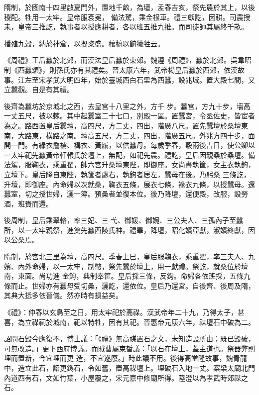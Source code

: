 \begin{pinyinscope}
 隋制，於國南十四里啟夏門外，置地千畝，為壇，孟春吉亥，祭先農於其上，以後稷配。牲用一太牢。皇帝服袞冕，
 備法駕，乘金根車。禮三獻訖，因耕。司農授耒，皇帝三推訖，執事者以授應耕者，各以班五推九推。而司徒帥其屬終千畝。



 播殖九穀，納於神倉，以擬粢盛。穰稿以餉犧牲云。



 《周禮》王后蠶於北郊，而漢法皇后蠶於東郊。魏遵《周禮》，蠶於北郊。吳韋昭制《西蠶頌》，則孫氏亦有其禮矣。晉太康六年，武帝楊皇后蠶於西郊，依漢故事。江左至宋孝武大明四年，始於臺城西白石里為西蠶，設兆域。置大殿七間，又立蠶觀。自是有其禮。



 後齊為蠶坊於京城北之西，去皇宮十八里之外，方千
 步。蠶宮，方九十步，墻高一丈五尺，被以棘。其中起蠶室二十七口，別殿一區。置蠶宮，令丞佐史，皆宦者為之。路西置皇后蠶壇，高四尺，方二丈，四出，階廣八尺。置先蠶壇於桑壇東南，大路東，橫路之南。壇高五尺，方二丈，四出，階廣五尺。外兆方四十步，面開一門。有綠衣詹襦、褠衣、黃履，以供蠶母。每歲季春，穀雨後吉日，使公卿以一太牢祀先蠶黃帝軒轅氏於壇上，無配，如祀先農。禮訖，皇后因親桑於桑壇。備法駕，服鞠衣，乘重翟，帥六宮升桑壇東陛，即御座。女尚書執筐，女主衣執鉤，立壇下。皇后降自東陛，執筐者處右，執鉤者居左，蠶母在後。乃躬桑
 三條訖，升壇，即御座。內命婦以次就桑，鞠衣五條，展衣七條，褖衣九條，以授蠶母。還蠶室，切之授世婦，灑一簿。預桑者並復本位。後乃降壇，還便殿，改服，設勞酒，班賚而還。



 後周制，皇后乘翠輅，率三妃、三弋、御媛、御婉、三公夫人、三孤內子至蠶所，以一太牢親祭，進奠先蠶西陵氏神。禮畢，降壇，昭化嬪亞獻，淑嬪終獻，因以公桑焉。



 隋制，於宮北三里為壇，高四尺。季春上巳，皇后服鞠衣，乘重翟，率三夫人、九嬪、內外命婦，以一太牢，制幣，祭先蠶於壇上，用一獻禮。祭訖，就桑位於壇南，東面。尚功進
 金鉤，典制奉筐。皇后採三條，反鉤。命婦各依班採，五條九條而止。世婦亦有蠶母受切桑，灑訖，還依位。皇后乃還宮。自後齊、後周及隋，其典大抵多依晉儀。然亦時有損益矣。



 《禮》：仲春以玄鳥至之日，用太牢祀於高禖。漢武帝年二十九，乃得太子，甚喜，為立禖祠於城南，祀以特牲，因有其祀。晉惠帝元康六年，禖壇石中破為二。



 詔問石毀今應復不，博士議：「《禮》無高禖置石之文，未知造設所由；既已毀破，可無改造。」更下西府博議。而賊曹屬束皙議：「以石在壇上，蓋主道也。祭器弊則埋而置新，今宜埋而更
 造，不宜遂廢。」時此議不用。後得高堂隆故事，魏青龍中，造立此石，詔更鐫石，令如舊，置高禖壇上。埋破石入地一丈。案梁太廟北門內道西有石，文如竹葉，小屋覆之，宋元嘉中修廟所得。陸澄以為孝武時郊禖之石。




\end{pinyinscope}
